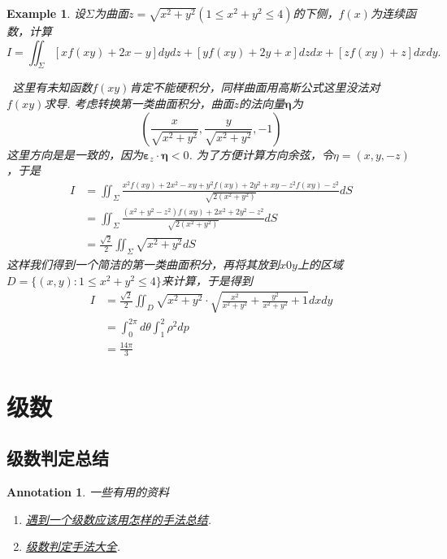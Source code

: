 \documentclass{article}
\newtheorem{example}[theorem]{Example}
\newtheorem{annotation}[theorem]{Annotation}
\newcommand{\hints}{{\color{blue} \text{hints}}}
\begin{document}
\begin{example}
\rm 设$\Sigma$为曲面$z = \sqrt{x^2 + y^2}(1 \leq x^2 + y^2 \leq 4)$的下侧，$f(x)$为连续函数，计算
$$
I = \iint_\Sigma [xf(xy) + 2x-y]dydz + [yf(xy) + 2y + x]dzdx + [zf(xy) + z]dxdy. 
$$

\hints\ 这里有未知函数$f(xy)$肯定不能硬积分，同样曲面用高斯公式这里没法对$f(xy)$求导. 考虑转换第一类曲面积分，曲面$z$的法向量$\bm{\eta}$为
$$
\left(\frac{x}{\sqrt{x^2+y^2}},\frac{y}{\sqrt{x^2+y^2}},-1 \right)
$$
这里方向是是一致的，因为$\bm{\varepsilon}_z \cdot \bm{\eta} < 0$. 为了方便计算方向余弦，令$\eta = (x,y,-z)$，于是
$$
\begin{aligned}
I &= \iint_{\Sigma} \frac{x^2f(xy) + 2x^2-xy + y^2f(xy)+2y^2 + xy - z^2f(xy)-z^2}{\sqrt{2(x^2+y^2)}}dS\\
& =  \iint_{\Sigma} \frac{(x^2+y^2-z^2)f(xy) + 2x^2+2y^2-z^2}{\sqrt{2(x^2+y^2)}}dS \\
& = \frac{\sqrt{2}}{2} \iint_{\Sigma} \sqrt{x^2 + y^2}dS
\end{aligned}
$$
这样我们得到一个简洁的第一类曲面积分，再将其放到$x0y$上的区域$D=\{(x,y): 1 \leq x^2 + y^2 \leq 4\}$来计算，于是得到
$$
\begin{aligned}
I &= \frac{\sqrt{2}}{2} \iint_D \sqrt{x^2 + y^2} \cdot  \sqrt{\frac{x^2}{x^2+y^2} + \frac{y^2}{x^2+y^2} + 1}dxdy \\
&= \int_0^{2\pi} d\theta \int_1^2 \rho^2 dp\\
&= \frac{14\pi}{3}
\end{aligned}
$$
\end{example}

\newpage
\section{级数}

\subsection{级数判定总结}

\begin{annotation}
\rm 一些有用的资料
\begin{enumerate}
	\item \href{https://sites.lafayette.edu/thompsmc/files/2016/03/Series_Summary.pdf}{遇到一个级数应该用怎样的手法总结}.
	\item \href{https://en.wikipedia.org/wiki/Convergence_tests}{级数判定手法大全}.
\end{enumerate}
\end{annotation}
\end{document}
